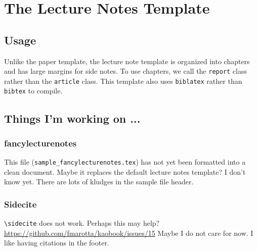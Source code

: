\documentclass[12pt, oneside]{report}    %
\let\oldsection\section
\def\section{%
  \setcounter{sidenote}{1}%
  \oldsection
}
\begin{document}

\etocsettocstyle{\footnotesize}{\normalsize}

  {\noindent}  %
  {\noindent}           %
  { 
    \makebox[.75cm][l]{\etocnumber}
    \etocname 
    \dotfill 
    \etocpage 
    \par}               %
  {}                    %





\chapter{The Lecture Notes Template}


\section{Usage}

Unlike the paper template, the lecture note template is organized into chapters and has large margins for side notes. To use chapters, we call the \texttt{report} class rather than the \texttt{article} class. This template also uses \texttt{biblatex} rather than \texttt{bibtex} to compile.


\section{Things I'm working on ...}

\subsection{fancylecturenotes}

This file (\verb!sample_fancylecturenotes.tex!) has not yet been formatted into a clean document. Maybe it replaces the default lecture notes template? I don't know yet. There are lots of kludges in the sample file header.

\subsection{Sidecite}
\verb!\sidecite! does not work. Perhaps this may help?
\url{https://github.com/fmarotta/kaobook/issues/15} Maybe I do not care for now. I like having citations in the footer.
\end{document}
